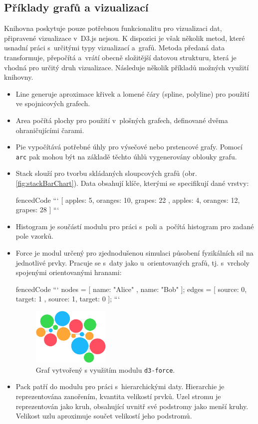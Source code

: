 \documentclass[
  digital, %
  oneside, %
  table,   %
  nolof,     %
  nolot,     %
  nocover
]{fithesis3}
\begin{document}
\subsection{Příklady grafů a vizualizací}\label{d3jsGraphs}
Knihovna poskytuje pouze potřebnou funkcionalitu pro vizualizaci dat, připravené vizualizace v~D3.js nejsou. K dispozici je však několik metod, které usnadní práci s~určitými typy vizualizací a~grafů. Metoda předaná data transformuje, přepočítá a~vrátí obecně složitější datovou strukturu, která je vhodná pro určitý druh vizualizace. Následuje několik příkladů možných využití knihovny. \cite{d3APIReference}
\begin{itemize}
  \item Line generuje aproximace křivek a lomené čáry (spline, poly\-line) pro použití ve spojnicových grafech.
  \item Area počítá plochy pro použití v~plošných grafech, definované dvěma ohraničujícími čarami.
  \item Pie vypočítává potřebné úhly pro výsečové nebo prstencové grafy. Pomocí \verb|arc| pak mohou být na základě těchto úhlů vygenerovány oblouky grafu.
  \item Stack slouží pro tvorbu skládaných sloupcových grafů (obr. \ref{fig:stackBarChart}). Data obsahují klíče, kterými se specifikují dané vrstvy:
\begin{markdown*}{
  fencedCode
}
```
	[{ apples: 5, oranges: 10, grapes: 22 },
	{ apples: 4, oranges: 12, grapes: 28 }]
```
\end{markdown*}
  \item Histogram je součástí modulu pro práci s~poli a~počítá histogram pro zadané pole vzorků.
  \item Force je modul určený pro zjednodušenou simulaci působení fyzikálních sil na jednotlivé prvky. Pracuje se s~daty jako u~orientovaných grafů, tj. s~vrcholy spojenými orientovanými hranami:
\begin{markdown*}{
  fencedCode
}
```
	nodes = [{ name: "Alice" }, { name: "Bob" }];
	edges = [{ source: 0, target: 1 },
			 { source: 1, target: 0 }];
```
\end{markdown*}
\begin{figure}[H]
  \begin{center}
    \includegraphics[width=3.7cm]{images/force.pdf}
  \end{center}
  \caption{Graf vytvořený s využitím modulu \texttt{d3-force}.}
  \label{fig:forceGraph}
\end{figure}
  \item Pack patří do modulu pro práci s~hierarchickými daty. Hierarchie je reprezentována zanořením, kvantita velikostí prvků. Uzel stromu je reprezentován jako kruh, obsahující uvnitř své podstromy jako menší kruhy. Velikost uzlu aproximuje součet velikostí jeho podstromů.
\end{itemize}
\end{document}
